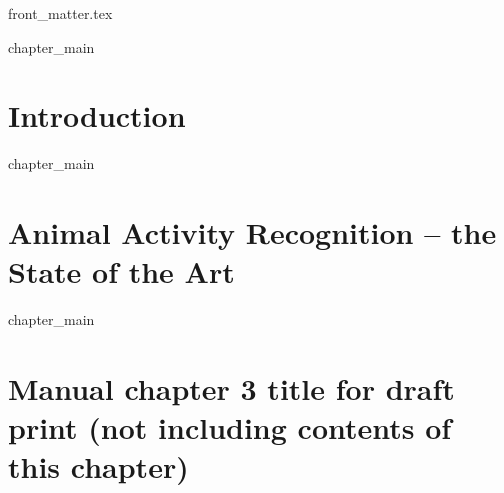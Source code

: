 \documentclass[print]{dissertation}
\begin{document}
\sloppy
\def \myAuthorName{John Doe}
\def \myTitle{Your Title}
\def \mySubTitle{Optional subtitle}





\newcommand{\mainrq}{
\medskip
\textit{
How do you define a good research question? 
}
\medskip
}

\ifdraft
\else
    {front_matter.tex}
\fi

\tableofcontents
\ifdraft
\fi

\mainmatter
\thumbtrue

\chaponetrue
\chaptwotrue
\chapeighttrue


\ifchapone
    {chapter_main}
\else
    \chapter{Introduction} %
    \label{chapter:introduction}
\fi

\ifchaptwo
    {chapter_main}
\else
    \chapter{Animal Activity Recognition -- the State of the Art} %
    \label{chapter:state_of_the_art}
\fi

\ifchapthree
    {chapter_main}
\else
    \chapter{Manual chapter 3 title for draft print (not including contents of this chapter)}
    \label{chapter:your_chapter_title_when_not_included}
\fi

\end{document}
